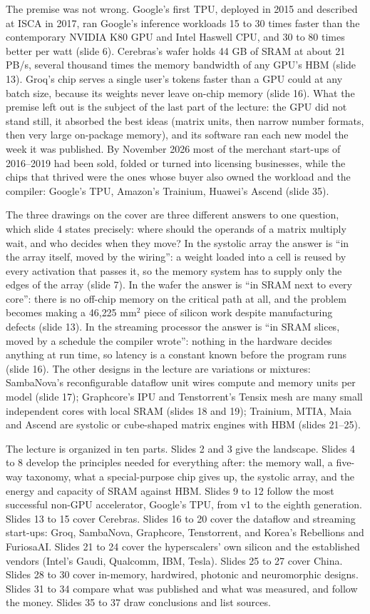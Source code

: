 \documentclass[11pt,letterpaper]{article}
\begin{document}
The premise was not wrong. Google's first TPU, deployed in 2015 and described at ISCA in 2017, ran Google's inference workloads 15 to 30 times faster than the contemporary NVIDIA K80 GPU and Intel Haswell CPU, and 30 to 80 times better per watt (slide 6). Cerebras's wafer holds 44 GB of SRAM at about 21 PB/s, several thousand times the memory bandwidth of any GPU's HBM (slide 13). Groq's chip serves a single user's tokens faster than a GPU could at any batch size, because its weights never leave on-chip memory (slide 16). What the premise left out is the subject of the last part of the lecture: the GPU did not stand still, it absorbed the best ideas (matrix units, then narrow number formats, then very large on-package memory), and its software ran each new model the week it was published. By November 2026 most of the merchant start-ups of 2016--2019 had been sold, folded or turned into licensing businesses, while the chips that thrived were the ones whose buyer also owned the workload and the compiler: Google's TPU, Amazon's Trainium, Huawei's Ascend (slide 35).

The three drawings on the cover are three different answers to one question, which slide 4 states precisely: where should the operands of a matrix multiply wait, and who decides when they move? In the systolic array the answer is ``in the array itself, moved by the wiring'': a weight loaded into a cell is reused by every activation that passes it, so the memory system has to supply only the edges of the array (slide 7). In the wafer the answer is ``in SRAM next to every core'': there is no off-chip memory on the critical path at all, and the problem becomes making a 46{,}225 mm$^2$ piece of silicon work despite manufacturing defects (slide 13). In the streaming processor the answer is ``in SRAM slices, moved by a schedule the compiler wrote'': nothing in the hardware decides anything at run time, so latency is a constant known before the program runs (slide 16). The other designs in the lecture are variations or mixtures: SambaNova's reconfigurable dataflow unit wires compute and memory units per model (slide 17); Graphcore's IPU and Tenstorrent's Tensix mesh are many small independent cores with local SRAM (slides 18 and 19); Trainium, MTIA, Maia and Ascend are systolic or cube-shaped matrix engines with HBM (slides 21--25).

The lecture is organized in ten parts. Slides 2 and 3 give the landscape. Slides 4 to 8 develop the principles needed for everything after: the memory wall, a five-way taxonomy, what a special-purpose chip gives up, the systolic array, and the energy and capacity of SRAM against HBM. Slides 9 to 12 follow the most successful non-GPU accelerator, Google's TPU, from v1 to the eighth generation. Slides 13 to 15 cover Cerebras. Slides 16 to 20 cover the dataflow and streaming start-ups: Groq, SambaNova, Graphcore, Tenstorrent, and Korea's Rebellions and FuriosaAI. Slides 21 to 24 cover the hyperscalers' own silicon and the established vendors (Intel's Gaudi, Qualcomm, IBM, Tesla). Slides 25 to 27 cover China. Slides 28 to 30 cover in-memory, hardwired, photonic and neuromorphic designs. Slides 31 to 34 compare what was published and what was measured, and follow the money. Slides 35 to 37 draw conclusions and list sources.
\end{document}
